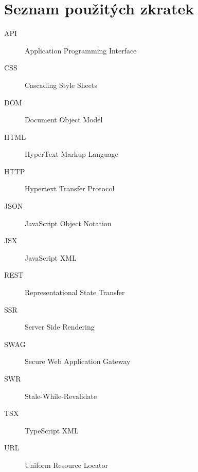\chapter{Seznam použitých zkratek}
\begin{description}
	\item[API] Application Programming Interface
	\item[CSS] Cascading Style Sheets   
	\item[DOM] Document Object Model 
	\item[HTML] HyperText Markup Language
	\item[HTTP] Hypertext Transfer Protocol 
	\item[JSON] JavaScript Object Notation
	\item[JSX] JavaScript XML 
	\item[REST] Representational State Transfer 
	\item[SSR] Server Side Rendering
	\item[SWAG] Secure Web Application Gateway 
	\item[SWR] Stale-While-Revalidate
	\item[TSX] TypeScript XML 
	\item[URL] Uniform Resource Locator 
\end{description}